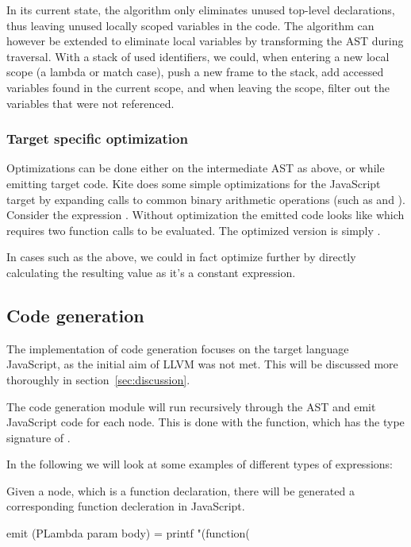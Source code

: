 In its current state, the algorithm only eliminates unused top-level declarations, thus leaving unused locally scoped variables in the code. The algorithm can however be extended to eliminate local variables by transforming the AST during traversal. With a stack of used identifiers, we could, when entering a new local scope (a lambda or match case), push a new frame to the stack, add accessed variables found in the current scope, and when leaving the scope, filter out the variables that were not referenced.

\subsubsection{Target specific optimization}
Optimizations can be done either on the intermediate AST as above, or while emitting target code. Kite does some simple optimizations for the JavaScript target by expanding calls to common binary arithmetic operations (such as \code{+} and \code{*}). Consider the expression . Without optimization the emitted code looks like  which  requires two function calls to be evaluated. The optimized version is simply .

In cases such as the above, we could in fact optimize further by directly calculating the resulting value as it's a constant expression.


\subsection{Code generation}
The implementation of code generation focuses on the target language JavaScript, as the initial aim of LLVM was not met. This will be discussed more thoroughly in section~\ref{sec:discussion}.

The code generation module will run recursively through the AST and emit JavaScript code for each node. This is done with the  function, which has the type signature of .

In the following we will look at some examples of different types of expressions:

Given a  node, which is a function declaration, there will be generated a corresponding function decleration in JavaScript.

\begin{haskell}
emit (PLambda param body) = printf "(function(%
\end{haskell}

